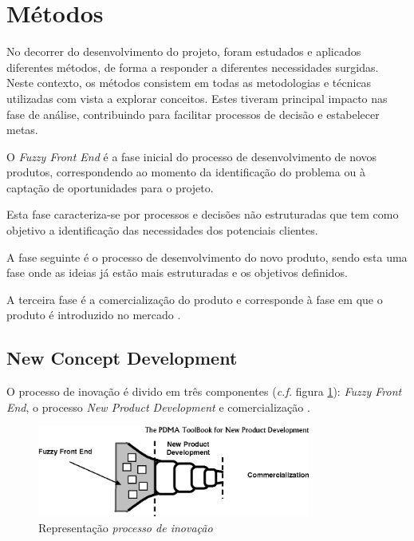 \section{Métodos\label{section_metodos}}
No decorrer do desenvolvimento do projeto, foram estudados e aplicados diferentes métodos, de forma a responder a diferentes necessidades surgidas. Neste contexto, os métodos consistem em todas as metodologias e técnicas utilizadas com vista a explorar conceitos. Estes tiveram principal impacto nas fase de análise, contribuindo para facilitar processos de decisão e estabelecer metas.

O \emph{Fuzzy Front End} é a fase inicial do processo de desenvolvimento de novos produtos, correspondendo ao momento da identificação do problema ou à captação de oportunidades para o
projeto.

Esta fase caracteriza-se por processos e decisões não estruturadas que tem como objetivo a identificação das necessidades dos potenciais clientes.

A fase seguinte é o processo de  desenvolvimento do novo produto, sendo esta uma fase onde as ideias já estão mais estruturadas e os objetivos definidos. 

A terceira fase é a comercialização do produto e corresponde à fase em que o produto é introduzido no mercado \cite{fuzzy_frontend}.

\subsection{New Concept Development \label{subsection_new_concept_development}}
O processo de inovação é divido em três componentes (\emph{c.f.} figura \ref{figura_processo_inovacao}): \emph{Fuzzy
Front End}, o processo \emph{New Product Development} e comercialização \cite{fuzzy_frontend}.

\begin{figure}[H]
    \begin{center}
    \includegraphics[width=0.8\textwidth]{figures/new_product_development.png}
    \caption{Representação \emph{processo de inovação}}
    \label{figura_processo_inovacao}
    \end{center}
\end{figure}

